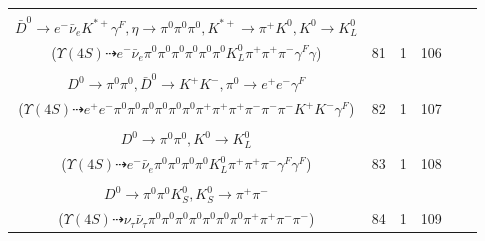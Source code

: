 \documentclass[landscape]{article}
\newcounter{rownumbers}
\newcommand\rn{\stepcounter{rownumbers}\arabic{rownumbers}}
\newcommand{\EOLP}{\\ \hline} %
\newcommand{\topoTags}[1]{#1} %
\begin{document}
\begin{longtable}{clcccc}
\rn & \makecell[l]{ $ 
\Upsilon(4S) \rightarrow B^{0} \bar{B}^{0} ,
B^{0} \rightarrow \pi^{-} \bar{D}^{*0} D_{s}^{+} ,
\bar{B}^{0} \rightarrow \pi^{0} D^{0} ,
\bar{D}^{*0} \rightarrow \bar{D}^{0} \gamma ,
D_{s}^{+} \rightarrow \pi^{+} \eta ,
D^{0} \rightarrow \pi^{0} \pi^{0} ,
$ \\ $
\bar{D}^{0} \rightarrow e^{-} \bar{\nu}_{e} K^{*+} \gamma^{F} ,
\eta \rightarrow \pi^{0} \pi^{0} \pi^{0} ,
K^{*+} \rightarrow \pi^{+} K^{0} ,
K^{0} \rightarrow K_{L}^{0} 
$ \\ ($
\Upsilon(4S) \dashrightarrow e^{-} \bar{\nu}_{e} \pi^{0} \pi^{0} \pi^{0} \pi^{0} \pi^{0} \pi^{0} K_{L}^{0} \pi^{+} \pi^{+} \pi^{-} \gamma^{F} \gamma 
$) } & \topoTags{81 & }1 & 106 \EOLP

\rn & \makecell[l]{ $ 
\Upsilon(4S) \rightarrow B^{0} \bar{B}^{0} ,
B^{0} \rightarrow \pi^{0} \pi^{0} \pi^{+} \pi^{+} \rho^{-} \omega D^{*-} ,
\bar{B}^{0} \rightarrow \pi^{0} D^{0} ,
\rho^{-} \rightarrow \pi^{0} \pi^{-} ,
\omega \rightarrow \pi^{0} \pi^{+} \pi^{-} ,
D^{*-} \rightarrow \pi^{-} \bar{D}^{0} ,
$ \\ $
D^{0} \rightarrow \pi^{0} \pi^{0} ,
\bar{D}^{0} \rightarrow K^{+} K^{-} ,
\pi^{0} \rightarrow e^{+} e^{-} \gamma^{F} 
$ \\ ($
\Upsilon(4S) \dashrightarrow e^{+} e^{-} \pi^{0} \pi^{0} \pi^{0} \pi^{0} \pi^{0} \pi^{0} \pi^{+} \pi^{+} \pi^{+} \pi^{-} \pi^{-} \pi^{-} K^{+} K^{-} \gamma^{F} 
$) } & \topoTags{82 & }1 & 107 \EOLP

\rn & \makecell[l]{ $ 
\Upsilon(4S) \rightarrow B^{0} \bar{B}^{0} ,
B^{0} \rightarrow \rho^{0} \rho^{+} D^{-} ,
\bar{B}^{0} \rightarrow \pi^{0} D^{0} ,
\rho^{0} \rightarrow \pi^{+} \pi^{-} ,
\rho^{+} \rightarrow \pi^{0} \pi^{+} ,
D^{-} \rightarrow e^{-} \bar{\nu}_{e} K^{0} \gamma^{F} \gamma^{F} ,
$ \\ $
D^{0} \rightarrow \pi^{0} \pi^{0} ,
K^{0} \rightarrow K_{L}^{0} 
$ \\ ($
\Upsilon(4S) \dashrightarrow e^{-} \bar{\nu}_{e} \pi^{0} \pi^{0} \pi^{0} \pi^{0} K_{L}^{0} \pi^{+} \pi^{+} \pi^{-} \gamma^{F} \gamma^{F} 
$) } & \topoTags{83 & }1 & 108 \EOLP

\rn & \makecell[l]{ $ 
\Upsilon(4S) \rightarrow B^{0} \bar{B}^{0} ,
B^{0} \rightarrow \pi^{0} \bar{D}^{0} ,
\bar{B}^{0} \rightarrow \tau^{-} \bar{\nu}_{\tau} D^{*+} ,
\bar{D}^{0} \rightarrow \pi^{0} \pi^{0} ,
\tau^{-} \rightarrow \nu_{\tau} \pi^{0} \pi^{0} \pi^{-} ,
D^{*+} \rightarrow \pi^{+} D^{0} ,
$ \\ $
D^{0} \rightarrow \pi^{0} \pi^{0} K_{S}^{0} ,
K_{S}^{0} \rightarrow \pi^{+} \pi^{-} 
$ \\ ($
\Upsilon(4S) \dashrightarrow \nu_{\tau} \bar{\nu}_{\tau} \pi^{0} \pi^{0} \pi^{0} \pi^{0} \pi^{0} \pi^{0} \pi^{0} \pi^{+} \pi^{+} \pi^{-} \pi^{-} 
$) } & \topoTags{84 & }1 & 109 \EOLP


\end{longtable}
\end{document}
